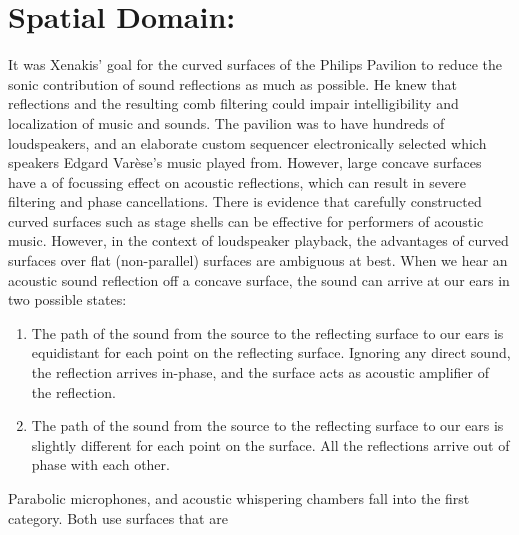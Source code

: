 \chapter{Spatial Domain: }
\label{ch:ref-mod}

It was Xenakis' goal for the curved surfaces of the Philips Pavilion
to reduce the sonic contribution of sound reflections as much as
possible.\cite{philips1958} He knew that reflections and the resulting
comb filtering could impair intelligibility and localization of music
and sounds.  The pavilion was to have hundreds of loudspeakers, and an
elaborate custom sequencer electronically selected which speakers
Edgard Var\`{e}se's music played from. However, large concave surfaces
have a of focussing effect on acoustic
reflections,\cite{Vercammen2008} which can result in severe filtering
and phase cancellations. There is evidence that carefully constructed
curved surfaces such as stage shells can be effective for performers
of acoustic music.\cite{DAntonio1991} However, in the context of
loudspeaker playback, the advantages of curved surfaces over flat
(non-parallel) surfaces are ambiguous at best.\cite{Cox2006} When we
hear an acoustic sound reflection off a concave surface, the sound can
arrive at our ears in two possible states:
\begin{enumerate}
\item The path of the sound from the source to the reflecting surface
  to our ears is equidistant for each point on the reflecting
  surface. Ignoring any direct sound, the reflection arrives in-phase,
  and the surface acts as acoustic amplifier of the reflection.
\item The path of the sound from the source to the reflecting surface
  to our ears is slightly different for each point on the surface. All
  the reflections arrive out of phase with each other.
\end{enumerate}
Parabolic microphones\cite{Davis1989}, and acoustic whispering
chambers fall into the first category. Both use surfaces that are
